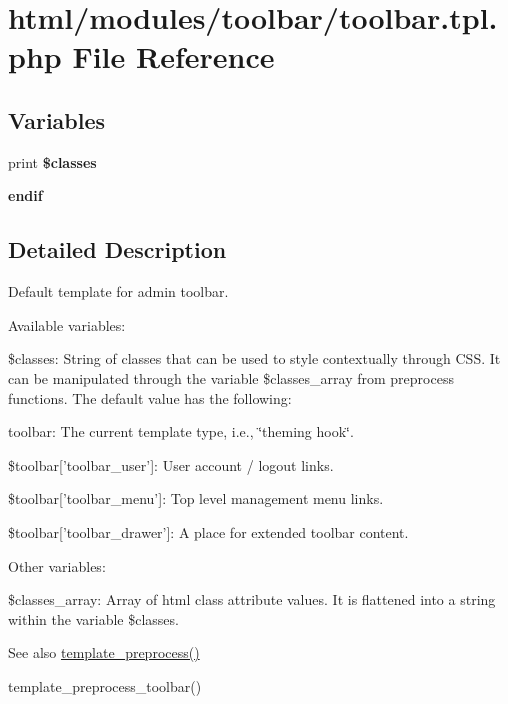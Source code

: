 \hypertarget{toolbar_8tpl_8php}{
\section{html/modules/toolbar/toolbar.tpl.php File Reference}
\label{toolbar_8tpl_8php}
}
\subsection*{Variables}
\begin{DoxyCompactItemize}
\item 
\hypertarget{toolbar_8tpl_8php_a6d48ecbdbc70ca1812e665169b5fa1e2}{
print {\bfseries \$classes}}
\label{toolbar_8tpl_8php_a6d48ecbdbc70ca1812e665169b5fa1e2}

\item 
\hypertarget{toolbar_8tpl_8php_a82cd33ca97ff99f2fcc5e9c81d65251b}{
{\bfseries endif}}
\label{toolbar_8tpl_8php_a82cd33ca97ff99f2fcc5e9c81d65251b}

\end{DoxyCompactItemize}


\subsection{Detailed Description}
Default template for admin toolbar.

Available variables:
\begin{DoxyItemize}
\item \$classes: String of classes that can be used to style contextually through CSS. It can be manipulated through the variable \$classes\_\-array from preprocess functions. The default value has the following:
\begin{DoxyItemize}
\item toolbar: The current template type, i.e., \char`\"{}theming hook\char`\"{}.
\end{DoxyItemize}
\item \$toolbar\mbox{[}'toolbar\_\-user'\mbox{]}: User account / logout links.
\item \$toolbar\mbox{[}'toolbar\_\-menu'\mbox{]}: Top level management menu links.
\item \$toolbar\mbox{[}'toolbar\_\-drawer'\mbox{]}: A place for extended toolbar content.
\end{DoxyItemize}

Other variables:
\begin{DoxyItemize}
\item \$classes\_\-array: Array of html class attribute values. It is flattened into a string within the variable \$classes.
\end{DoxyItemize}

\begin{DoxySeeAlso}{See also}
\hyperlink{includes_2theme_8inc_a3eeb7bcdba7ef4859f99586da264d347}{template\_\-preprocess()} 

template\_\-preprocess\_\-toolbar() 
\end{DoxySeeAlso}
